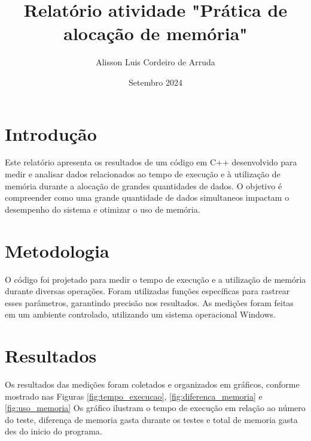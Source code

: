 \documentclass{article}
\title{Relatório atividade "Prática de alocação de memória"}
\author{Alisson Luis Cordeiro de Arruda}
\date{Setembro 2024}
\begin{document}
\maketitle

\section{Introdução}
Este relatório apresenta os resultados de um código em C++ desenvolvido para medir e analisar dados relacionados ao tempo de execução e à utilização de memória durante a alocação de grandes quantidades de dados. O objetivo é compreender como uma grande quantidade de dados simultaneos impactam o desempenho do sistema e otimizar o uso de memória.

\section{Metodologia}
O código foi projetado para medir o tempo de execução e a utilização de memória durante diversas operações. Foram utilizadas funções específicas para rastrear esses parâmetros, garantindo precisão nos resultados. As medições foram feitas em um ambiente controlado, utilizando um sistema operacional Windows.

\section{Resultados}
Os resultados das medições foram coletados e organizados em gráficos, conforme mostrado nas Figuras \ref{fig:tempo_execucao}, \ref{fig:diferenca_memoria} e \ref{fig:uso_memoria} Os gráfico ilustram o tempo de execução em relação ao número do teste, diferença de memoria gasta durante os testes e total de memoria gasta des do inicio do programa.
\end{document}
